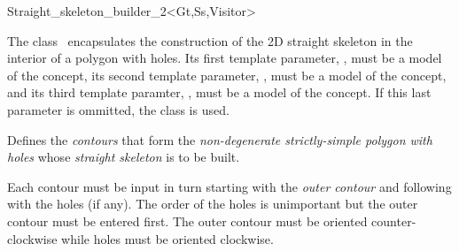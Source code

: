 

\begin{ccRefClass}{Straight_skeleton_builder_2<Gt,Ss,Visitor>}

\ccDefinition
The class \ccRefName\  encapsulates the construction of the 2D straight skeleton in the interior of a polygon with holes. Its first template parameter, , must be a model of the  concept, its second template parameter, , must be a model of the  concept, and its third template paramter, , must be a model of the  concept. If this last parameter is ommitted, the class  is used.

 
\ccTypes
\ccGlue
\ccGlue

\ccCreation
{}


{Defines the \textit{contours} that form the \textit{non-degenerate strictly-simple polygon with holes} whose \textit{straight skeleton} is to be built. 

Each contour must be input in turn starting with the \textit{outer contour} and following with the holes (if any). The order of the holes is unimportant but the outer contour must be entered first. The outer contour must be oriented counter-clockwise while holes must be oriented clockwise. 

}
\end{ccRefClass}

